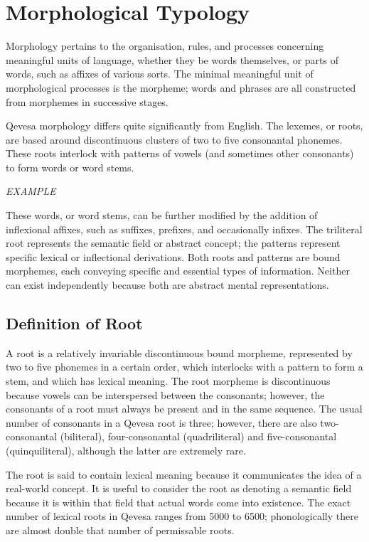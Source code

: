 \documentclass[grammar]{subfiles}
\begin{document}
	\chapter{Morphological Typology}
	\label{ch:morphological_typology}

	Morphology pertains to the organisation, rules, and processes concerning meaningful units of language, whether they be words themselves, or parts of words, such as affixes of various sorts. The minimal meaningful unit of morphological processes is the morpheme; words and phrases are all constructed from morphemes in successive stages.
	
	Qevesa morphology differs quite significantly from English. The lexemes, or roots, are based around discontinuous clusters of two to five consonantal phonemes. These roots interlock with patterns of vowels (and sometimes other consonants) to form words or word stems.

	\begin{exe}
		\ex \emph{EXAMPLE}
	\end{exe}

	These words, or word stems, can be further modified by the addition of inflexional affixes, such as suffixes, prefixes, and occasionally infixes. The triliteral root represents the semantic field or abstract concept; the patterns represent specific lexical or inflectional derivations. Both roots and patterns are bound morphemes, each conveying specific and essential types of information. Neither can exist independently because both are abstract mental representations. 

	\section{Definition of Root}
	\label{sec:definition_of_root}

	A root is a relatively invariable discontinuous bound morpheme, represented by two to five phonemes in a certain order, which interlocks with a pattern to form a stem, and which has lexical meaning. The root morpheme is discontinuous because vowels can be interspersed between the consonants; however, the consonants of a root must always be present and in the same sequence. The usual number of consonants in a Qevesa root is three; however, there are also two-consonantal (biliteral), four-consonantal (quadriliteral) and five-consonantal (quinquiliteral), although the latter are extremely rare.

	The root is said to contain lexical meaning because it communicates the idea of a real-world concept. It is useful to consider the root as denoting a semantic field because it is within that field that actual words come into existence. The exact number of lexical roots in Qevesa ranges from 5000 to 6500; phonologically there are almost double that number of permissable roots.
\end{document}
